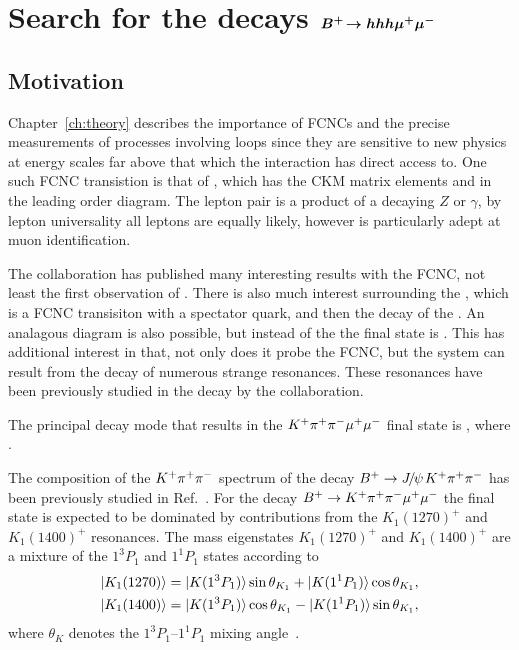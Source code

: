 \chapter[Search for the decays $\Bp\!\to hhh\mumu$]{Search for the decays $\boldsymbol{B^+\!\rightarrow hhh\mu^+\mu^-}$}
\label{ch:hhh}




\section{Motivation}
Chapter~\ref{ch:theory} describes the importance of FCNCs and the precise measurements of processes
involving loops since they are sensitive to new physics at energy scales far above that which the
interaction has direct access to.
One such FCNC transistion is that of , which has the CKM matrix elements
 and  in the leading order diagram.
The lepton pair is a product of a decaying $Z$ or $\gamma$, by lepton universality all leptons are
equally likely, however \lhcb is particularly adept at muon identification.

The \lhcb collaboration has published many interesting results with the  FCNC, not
least the first observation of \decay{\Bs}{\mumu}.
There is also much interest surrounding the \decay{\Bd}{\Kstar\mumu}, which is a  FCNC
transisiton with a spectator quark, and then the decay of the \Kstar.
An analagous diagram is also possible, but instead of the \Kstar the final state is \kpipi.
This has additional interest in that, not only does it probe the FCNC, but the \kpipi system can
result from the decay of numerous strange resonances.
These resonances have been previously studied in the decay \btojpsikpipi by the \belle
collaboration.

The principal decay mode that results in the ${K^+\pi^+\pi^-}\mu^+\mu^-$ final state is
, where .

The composition of the $K^+\pi^+\pi^-$ spectrum of the decay $\Bp\to\jpsi\Kp\pip\pim$ has been
previously studied in Ref.~\cite{Guler:2010if}.
For the decay $B^+\rightarrow K^+\pi^+\pi^-\mu^+\mu^-$ the final state is expected to be dominated by
contributions from the $K_1(1270)^+$ and $K_1(1400)^+$ resonances.
The mass eigenstates $K_1(1270)^+$ and $K_1(1400)^+$ are a mixture of the $1^3P_1$ and $1^1P_1$
states according to
\begin{align}
  \ket{K_1(1270)} &= \ket{K(1^3P_1)}\sin\theta_{K_1} + \ket{K(1^1P_1)}\cos\theta_{K_1},\nonumber\\
  \ket{K_1(1400)} &= \ket{K(1^3P_1)}\cos\theta_{K_1} - \ket{K(1^1P_1)}\sin\theta_{K_1},%
  \label{eq:k1mixing}
\end{align}
where $\theta_K$ denotes the $1^3P_1\text{--}1^1P_1$ %
mixing angle~\cite{Hatanaka:2008gu}.

